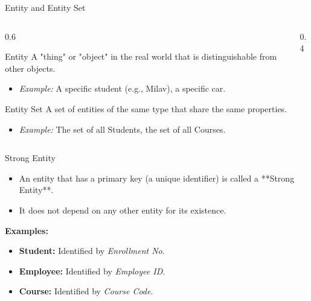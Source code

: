 \documentclass[aspectratio=169, xcolor=dvipsnames]{beamer}
\begin{document}
\begin{frame}{Entity and Entity Set}
    \begin{columns}
        \begin{column}{0.6\textwidth}
            \begin{block}{Entity}
            A "thing" or "object" in the real world that is distinguishable from other objects.
            \begin{itemize}
                \item \textit{Example:} A specific student (e.g., Milav), a specific car.
            \end{itemize}
            \end{block}
            
            \begin{block}{Entity Set}
            A set of entities of the same type that share the same properties.
            \begin{itemize}
                \item \textit{Example:} The set of all Students, the set of all Courses.
            \end{itemize}
            \end{block}
        \end{column}
        
        \begin{column}{0.4\textwidth}
            \centering
        \end{column}
    \end{columns}
\end{frame}

\begin{frame}{Strong Entity}
    \begin{itemize}
        \item An entity that has a primary key (a unique identifier) is called a **Strong Entity**.
        \item It does not depend on any other entity for its existence.
    \end{itemize}
    
    \vspace{2em}
    
    \textbf{Examples:}
    \begin{itemize}
        \item \textbf{Student:} Identified by \textit{Enrollment No}.
        \item \textbf{Employee:} Identified by \textit{Employee ID}.
        \item \textbf{Course:} Identified by \textit{Course Code}.
    \end{itemize}
\end{frame}
\end{document}
